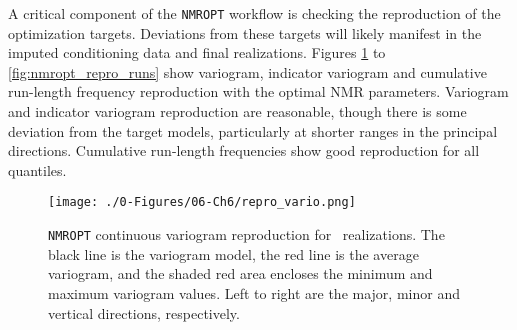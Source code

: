 A critical component of the \texttt{NMROPT} workflow is checking the reproduction of the optimization targets. Deviations from these targets will likely manifest in the imputed conditioning data and final realizations. Figures \ref{fig:nmropt_repro_vario} to \ref{fig:nmropt_repro_runs} show variogram, indicator variogram and cumulative run-length frequency reproduction with the optimal \gls{NMR} parameters. Variogram and indicator variogram reproduction are reasonable, though there is some deviation from the target models, particularly at shorter ranges in the principal directions. Cumulative run-length frequencies show good reproduction for all quantiles.


\begin{figure}[htb!]
    \centering
    \texttt{[image: ./0-Figures/06-Ch6/repro\_vario.png]}
    \caption{\texttt{NMROPT} continuous variogram reproduction for \csnreals \ realizations. The black line is the variogram model, the red line is the average variogram, and the shaded red area encloses the minimum and maximum variogram values. Left to right are the major, minor and vertical directions, respectively.}
    \label{fig:nmropt_repro_vario}
\end{figure}

